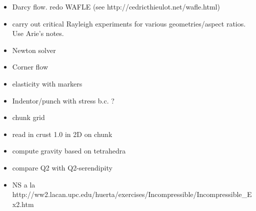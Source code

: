 
\begin{itemize}
\item Darcy flow. redo WAFLE (see http://cedricthieulot.net/wafle.html)
\item carry out critical Rayleigh experiments for various geometries/aspect ratios. Use Arie's notes. 
\item Newton solver
\item Corner flow 
\item elasticity with markers
\item Indentor/punch with stress b.c. ?
\item chunk grid
\item read in crust 1.0 in 2D on chunk
\item compute gravity based on tetrahedra
\item compare Q2 with Q2-serendipity
\item NS a la http://ww2.lacan.upc.edu/huerta/exercises/Incompressible/Incompressible\_Ex2.htm
\end{itemize}
